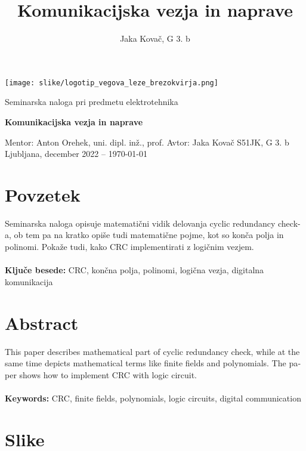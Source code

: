 \documentclass[12pt]{article}
\title{Komunikacijska vezja in naprave}
\author{Jaka Kovač, G 3. b}
\begin{document}

\begin{center}
    \thispagestyle{empty}
    \texttt{[image: slike/logotip\_vegova\_leze\_brezokvirja.png]}
    
    \vspace{\fill} 
    Seminarska naloga pri predmetu elektrotehnika

    \Huge{\textbf{Komunikacijska vezja in naprave}}

    \normalsize
    \vspace{\fill}

    Mentor: Anton Orehek, uni. dipl. inž., prof. \hfill Avtor: Jaka Kovač S51JK,
    G 3. b\\
    \null
    Ljubljana, december 2022 – \MMYYYYdate\today
\end{center}
\newpage
\thispagestyle{empty}
\null
\newpage
\thispagestyle{empty}

\section*{Povzetek}
Seminarska naloga opisuje matematični vidik delovanja cyclic redundancy check-a,
ob tem pa na kratko opiše tudi matematične pojme, kot so konča polja in polinomi.
Pokaže tudi, kako CRC implementirati z logičnim vezjem.\\
\\
\textbf{Ključe besede:} CRC, končna polja, polinomi, logična vezja, digitalna
komunikacija\\

\vfill
\section*{Abstract}
\foreignlanguage{english}{This paper describes mathematical part of cyclic 
redundancy check, while at the same time depicts mathematical terms like finite
fields and polynomials. The paper shows how to implement CRC with logic circuit.
\\
\\
\textbf{Keywords:} CRC, finite fields, polynomials, logic circuits, digital 
communication}

\vfill
\newpage
\thispagestyle{empty}
\tableofcontents

\begingroup
\makeatletter
\section*{Slike}
\let\clearpage\relax
\makeatother
\endgroup
\end{document}
